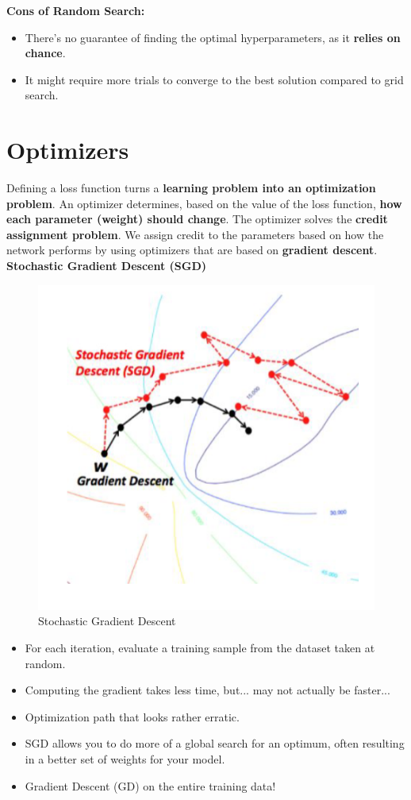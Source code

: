 \textbf{Cons of Random Search:}

\begin{itemize}
    \item There's no guarantee of finding the optimal hyperparameters, as it \textbf{relies on chance}.
    \item It might require more trials to converge to the best solution compared to grid search.
\end{itemize}

\section{Optimizers}

Defining a loss function turns a \textbf{learning problem into an optimization problem}. An optimizer determines, based on the value of the loss function, \textbf{how each parameter (weight) should change}. The optimizer solves the \textbf{credit assignment problem}. We assign credit to the parameters based on how the network performs by using optimizers that are based on \textbf{gradient descent}.\\

\noindent\textbf{Stochastic Gradient Descent (SGD)}

\begin{figure}[h!t]
    \centering
    \includegraphics[width=0.35\linewidth]{SGD.png}
    \caption{Stochastic Gradient Descent}
    \label{fig:enter-label}
\end{figure}

\begin{itemize}
    \item For each iteration, evaluate a training sample from the dataset taken at random.
    \item Computing the gradient takes less time, but... may not actually be faster...
    \item Optimization path that looks rather erratic.
    \item SGD allows you to do more of a global search for an optimum, often resulting in a better set of weights for your model.
    \item Gradient Descent (GD) on the entire training data!
\end{itemize}

